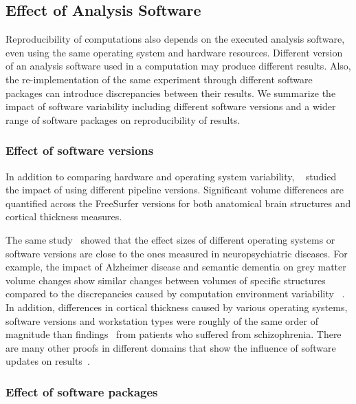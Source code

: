 \subsection{Effect of Analysis Software}

Reproducibility of computations also depends on the executed analysis 
software, even using the same operating system and hardware resources. 
Different version of an analysis software used in a computation may 
produce different results. Also, the re-implementation of the same 
experiment through different software packages can introduce 
discrepancies between their results. We summarize the impact of 
software variability including different software versions and a wider 
range of software packages on reproducibility of results. 

\subsubsection{Effect of software versions} 

In addition to comparing hardware and operating system variability,
~\cite{Gronenschild2012} studied the impact of using different pipeline 
versions.
Significant volume differences are quantified across the FreeSurfer 
versions for both anatomical brain structures and cortical thickness 
measures. 

The same study~\cite{Gronenschild2012} showed that the effect 
sizes of different operating systems or software versions are close to 
the ones measured in neuropsychiatric diseases. For example, the impact 
of Alzheimer disease and semantic dementia on grey matter volume changes
show similar changes between volumes of specific structures compared to 
the discrepancies caused by computation environment variability 
~\cite{Gronenschild2012}. In addition, differences in cortical 
thickness caused by various operating systems, software versions and 
workstation types were roughly of the same order of magnitude than 
findings~\cite{kuperberg2003regionally} from patients who 
suffered from schizophrenia. There are many other proofs in different 
domains that show the influence of software updates on  
results~\cite{shim2015effect, wadi2016impact}.

\subsubsection{Effect of software packages} 
\label{swf_effect}

